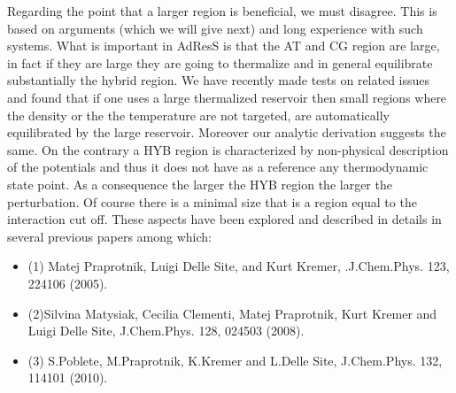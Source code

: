 \documentclass[12pt]{article}
\begin{document}
Regarding the point that a larger
region is beneficial, we must disagree. This is based on arguments
(which we will give next) and long experience with such systems. What
is important in AdResS is that the AT and CG region are large, in fact
if they are large they are going to thermalize and in general
equilibrate substantially the hybrid region.  We have recently made
tests on related issues and found that if one uses a large thermalized
reservoir then small regions where the density or the the temperature
are not targeted, are automatically equilibrated by the large
reservoir. Moreover our analytic derivation suggests the same.  On the
contrary a HYB region is characterized by non-physical description of
the potentials and thus it does not have as a reference any
thermodynamic state point. As a consequence the larger the HYB region
the larger the perturbation. Of course there is a minimal size that is
a region equal to the interaction cut off.  These aspects have been
explored and described in details in several previous papers among
which:
\begin{itemize}
\item (1) Matej Praprotnik, Luigi Delle Site, and Kurt Kremer, .J.Chem.Phys. 123, 224106 (2005).
\item (2)Silvina Matysiak, Cecilia Clementi, Matej Praprotnik, Kurt Kremer and Luigi Delle Site, J.Chem.Phys. 128, 024503 (2008).
\item (3) S.Poblete, M.Praprotnik, K.Kremer and L.Delle Site,  J.Chem.Phys. 132, 114101 (2010).
\end{itemize}


{\color{blue}{\it (9) Table I. What results of Ref. 15 corresponds to
    table I?, this is not mentioned. Results in Ref 12 and 15 were
    made at lower concentration, but the authors state that the excess
    chem pot is not sensible to the solute concentration in this
    regime. And say that ``we have verified that such consistency
    holds''. This is important though, and the authors should include
    a graph with the calculated excess chem. pot. against the solute
    concentration, showing that it goes to a plateau at low
    concentration consistent with the experimental value reported (at
    least for some of the cases considered). Error bars are crucial,
    but means nothing without the simulation times required to obtain
    them. The authors should include a more clear measure of this. A
    possible one could be showing the accumulated standard error
    against the simulation time and compare the IPM, the TI (free
    energy estimate using Bennet's method) and their own method. With
    the specification of the system size (table II) this already gives
    an idea of the computational costs.}}
\end{document}
